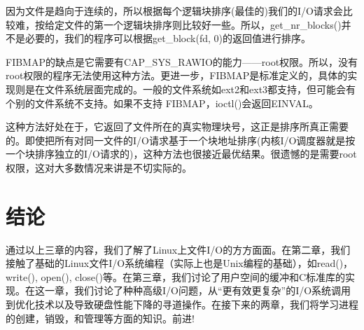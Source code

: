 因为文件是趋向于连续的，所以根据每个逻辑块排序(最佳的)我们的I/O请求会比较难，按给定文件的第一个逻辑块排序则比较好一些。所以，get\_nr\_blocks()并不是必要的，我们的程序可以根据get\_block(fd, 0)的返回值进行排序。

FIBMAP的缺点是它需要有CAP\_SYS\_RAWIO的能力——root权限。所以，没有root权限的程序无法使用这种方法。更进一步，FIBMAP是标准定义的，具体的实现则是在文件系统层面完成的。一般的文件系统如ext2和ext3都支持，但可能会有个别的文件系统不支持。如果不支持 FIBMAP，ioctl()会返回EINVAL。

这种方法好处在于，它返回了文件所在的真实物理块号，这正是排序所真正需要的。即使把所有对同一文件的I/O请求基于一个块地址排序(内核I/O调度器就是按一个块排序独立的I/O请求的)，这种方法也很接近最优结果。很遗憾的是需要root权限，这对大多数情况来讲是不切实际的。

\section{结论}

通过以上三章的内容，我们了解了Linux上文件I/O的方方面面。在第二章，我们接触了基础的Linux文件I/O系统编程（实际上也是Unix编程的基础），如read()，write(), open(), close()等。在第三章，我们讨论了用户空间的缓冲和C标准库的实现。在这一章，我们讨论了种种高级I/O问题，从“更有效更复杂”的I/O系统调用到优化技术以及导致硬盘性能下降的寻道操作。在接下来的两章，我们将学习进程的创建，销毁，和管理等方面的知识。前进!


